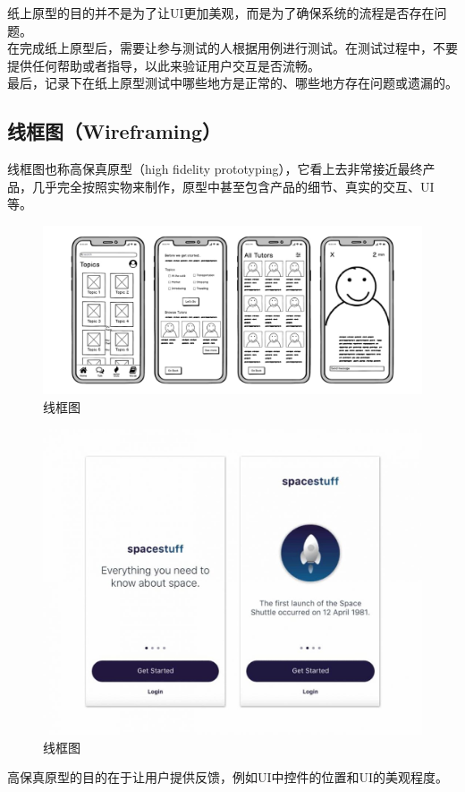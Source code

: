 纸上原型的目的并不是为了让UI更加美观，而是为了确保系统的流程是否存在问题。\\

在完成纸上原型后，需要让参与测试的人根据用例进行测试。在测试过程中，不要提供任何帮助或者指导，以此来验证用户交互是否流畅。\\

最后，记录下在纸上原型测试中哪些地方是正常的、哪些地方存在问题或遗漏的。\\

\subsection{线框图（Wireframing）}

线框图也称高保真原型（high fidelity prototyping），它看上去非常接近最终产品，几乎完全按照实物来制作，原型中甚至包含产品的细节、真实的交互、UI等。\\

\begin{figure}[H]
    \centering
    \includegraphics[scale=0.35]{img/Chapter1/1-3/3.png}
    \caption{线框图}
\end{figure}

\begin{figure}[H]
    \centering
    \includegraphics[scale=0.5]{img/Chapter1/1-3/4.png}
    \caption{线框图}
\end{figure}

高保真原型的目的在于让用户提供反馈，例如UI中控件的位置和UI的美观程度。

\newpage
